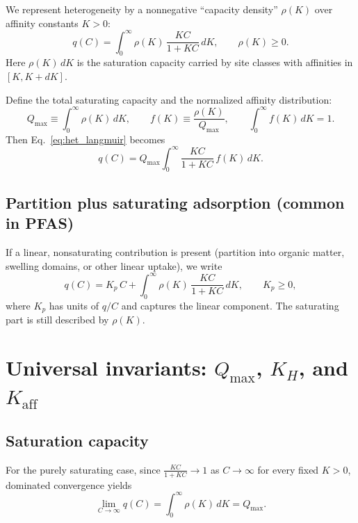\documentclass[12pt]{article}
\begin{document}
	We represent heterogeneity by a nonnegative ``capacity density'' $\rho(K)$ over affinity constants $K>0$:
	\begin{equation}
		q(C) = \int_{0}^{\infty} \rho(K)\,\frac{K C}{1 + K C}\,dK,
		\qquad \rho(K)\ge 0.
		\label{eq:het_langmuir}
	\end{equation}
	Here $\rho(K)\,dK$ is the saturation capacity carried by site classes with affinities in $[K,K+dK]$.
	
	Define the total saturating capacity and the normalized affinity distribution:
	\begin{equation}
		Q_{\max} \equiv \int_0^\infty \rho(K)\,dK,
		\qquad
		f(K) \equiv \frac{\rho(K)}{Q_{\max}},
		\qquad
		\int_0^\infty f(K)\,dK = 1.
		\label{eq:f_def}
	\end{equation}
	Then Eq.~\eqref{eq:het_langmuir} becomes
	\begin{equation}
		q(C) = Q_{\max}\int_0^\infty \frac{K C}{1 + K C}\,f(K)\,dK.
		\label{eq:het_langmuir_norm}
	\end{equation}
	
	\subsection{Partition plus saturating adsorption (common in PFAS)}
	
	If a linear, nonsaturating contribution is present (partition into organic matter, swelling domains, or other linear uptake), we write
	\begin{equation}
		q(C) = K_p\,C + \int_{0}^{\infty} \rho(K)\,\frac{K C}{1 + K C}\,dK,
		\qquad K_p \ge 0,
		\label{eq:partition_plus_langmuir}
	\end{equation}
	where $K_p$ has units of $q/C$ and captures the linear component. The saturating part is still described by $\rho(K)$.
	
	\section{Universal invariants: $Q_{\max}$, $K_H$, and $K_{\mathrm{aff}}$}
	
	\subsection{Saturation capacity}
	
	For the purely saturating case, since $\frac{K C}{1+K C}\to 1$ as $C\to\infty$ for every fixed $K>0$, dominated convergence yields
	\begin{equation}
		\lim_{C\to\infty} q(C) = \int_0^\infty \rho(K)\,dK = Q_{\max}.
		\label{eq:Qmax_limit}
	\end{equation}
	
\end{document}

